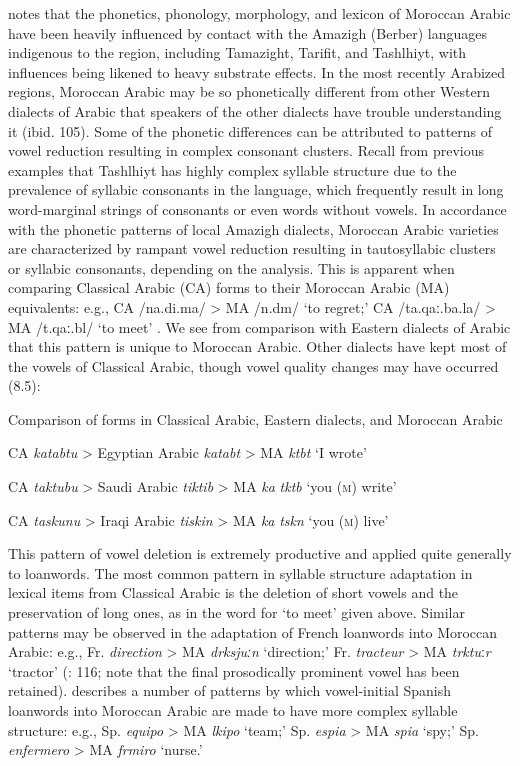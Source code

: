   \citet{Chtatou1997} notes that the phonetics, phonology, morphology, and lexicon of Moroccan Arabic have been heavily influenced by contact with the Amazigh (Berber) languages indigenous to the region, including Tamazight, Tarifit, and Tashlhiyt, with influences being likened to heavy substrate effects. In the most recently Arabized regions, Moroccan Arabic may be so phonetically different from other Western dialects of Arabic that speakers of the other dialects have trouble understanding it (ibid. 105). Some of the phonetic differences can be attributed to patterns of vowel reduction resulting in complex consonant clusters. Recall from previous examples that Tashlhiyt has highly complex syllable structure due to the prevalence of syllabic consonants in the language, which frequently result in long word-marginal strings of consonants or even words without vowels. In accordance with the phonetic patterns of local Amazigh dialects, Moroccan Arabic varieties are characterized by rampant vowel reduction resulting in tautosyllabic clusters or syllabic consonants, depending on the analysis. This is apparent when comparing Classical Arabic (CA) forms to their Moroccan Arabic (MA) equivalents: e.g., CA /na.di.ma/ > MA /n.dm/ ‘to regret;’ CA /ta.qaː.ba.la/ > MA /t.qaː.bl/ ‘to meet’ \citep[110]{Chtatou1997}. We see from comparison with Eastern dialects of Arabic that this pattern is unique to Moroccan Arabic. Other dialects have kept most of the vowels of Classical Arabic, though vowel quality changes may have occurred (8.5):

\ea\label{ex:(8.5)}
  Comparison of forms in Classical Arabic, Eastern dialects, and Moroccan Arabic

  CA \textit{katabtu} > Egyptian Arabic \textit{katabt} > MA \textit{ktbt} ‘I wrote’ 

  CA \textit{taktubu} > Saudi Arabic \textit{tiktib} > MA \textit{ka} \textit{tktb} ‘you (\textsc{m}) write’

  CA \textit{taskunu} > Iraqi Arabic \textit{tiskin} > MA \textit{ka} \textit{tskn} ‘you (\textsc{m}) live’

\citep[111-12]{Chtatou1997}

\z

This pattern of vowel deletion is extremely productive and applied quite generally to loanwords. The most common pattern in syllable structure adaptation in lexical items from Classical Arabic is the deletion of short vowels and the preservation of long ones, as in the word for ‘to meet’ given above. Similar patterns may be observed in the adaptation of French loanwords into Moroccan Arabic: e.g., Fr. \textit{direction} > MA \textit{drksjuːn} ‘direction;’ Fr. \textit{tracteur} > MA \textit{trktu}ː\textit{r} ‘tractor’ (\citealt{Chatou1997}: 116; note that the final prosodically prominent vowel has been retained). \citet{Sayahi2005} describes a number of patterns by which vowel-initial Spanish loanwords into Moroccan Arabic are made to have more complex syllable structure: e.g., Sp. \textit{equipo} > MA \textit{lkipo} ‘team;’ Sp. \textit{espia} > MA \textit{spia} ‘spy;’ Sp. \textit{enfermero} > MA \textit{frmiro} ‘nurse.’

